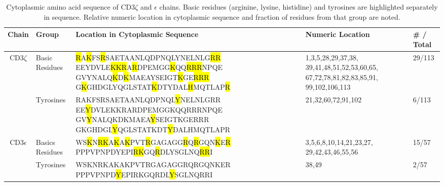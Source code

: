 \documentclass[../../AdvancementSummary.tex]{subfiles}
\begin{document}
\begin{table}[H]
    \caption{Cytoplasmic amino acid sequence of CD3$\zeta$ and $\epsilon$ chains.  Basic residues (arginine, lysine, histidine) and tyrosines are highlighted separately in sequence.  Relative numeric location in cytoplasmic sequence and fraction of residues from that group are noted. \label{table: BasicsYLocation}}
    \begin{center}
    \begin{tabular}{|c|p{2cm}|p{8cm}|p{3.5cm}|p{1.6cm}|}
    	\hline
	Chain 		& 		Group			&		Location in Cytoplasmic Sequence	&	Numeric Location		&		\# / Total	\\
	\hline
	
	
    	\multicolumn{1}{|c|}{\multirow{2}[0]{*}{CD3$\zeta$}} 	&  	Basic Residues				& 	
	
	\hl{R}A\hl{K}FS\hl{R}SAETAANLQDPNQLYNELNLG\hl{RR}
	EEYDVLE\hl{KKR}A\hl{R}DPEMGG\hl{K}QQ\hl{RRR}NPQE
	GVYNALQ\hl{K}D\hl{K}MAEAYSEIGT\hl{K}GE\hl{RRR}
	G\hl{K}GHDGLYQGLSTAT\hl{K}DTYDAL\hl{H}MQTLAP\hl{R}			& 	
	
	1,3,5,28,29,37,38,
	39,41,48,51,52,53,60,65,
	67,72,78,81,82,83,85,91,
	99,102,106,113 		& 	
	
	29/113	\\
	\cline{2-5}
	
	
	
		&	 Tyrosines									&	
	
	RAKFSRSAETAANLQDPNQL\hl{Y}NELNLGRR
	EE\hl{Y}DVLEKKRARDPEMGGKQQRRRNPQE
	GV\hl{Y}NALQKDKMAEA\hl{Y}SEIGTKGERRR
	GKGHDGL\hl{Y}QGLSTATKDT\hl{Y}DALHMQTLAPR 				& 	
	
	21,32,60,72,91,102											&	
	
	6/113			\\
	\hline
	
	
	\multicolumn{1}{|c|}{\multirow{2}{*}{CD3$\epsilon$}}	&	 Basics Residues		&
	
	WS\hl{K}N\hl{RK}A\hl{K}A\hl{K}PVT\hl{R}GAGAGG\hl{R}Q\hl{R}GQN\hl{K}E\hl{R}
	PPPVPNPDYEPI\hl{RK}GQ\hl{R}DLYSGLNQ\hl{RR}I					& 	
	
	3,5,6,8,10,14,21,23,27,
	29,42,43,46,55,56	&		
	
	15/57	\\
	\cline{2-5}
	
	
		&		 Tyrosines				& 	
	
	WSKNRKAKAKPVTRGAGAGGRQRGQNKER
	PPPVPNPD\hl{Y}EPIRKGQRDL\hl{Y}SGLNQRRI			&
	
	 38,49		& 		
	 
	 2/57			\\
	\hline
    \end{tabular}
    \end{center}
\end{table}
\end{document}
